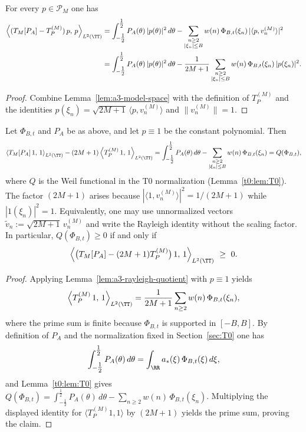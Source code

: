 \begin{lemma}\label{lem:a3-rayleigh-quotient}
For every $p\in\mathcal P_M$ one has
\begin{align*}
  \left\langle (T_M[P_A]-T_P^{(M)})\,p,\,p\right\rangle_{L^2(\TT)}
  &= \int_{-\tfrac12}^{\tfrac12} P_A(\theta)\,|p(\theta)|^2\,d\theta
    - \sum_{\substack{n\ge2\\ |\xi_n|\le B}} w(n)\,\Phi_{B,t}(\xi_n)\,|\langle p,v_n^{(M)}\rangle|^2 \\
  &= \int_{-\tfrac12}^{\tfrac12} P_A(\theta)\,|p(\theta)|^2\,d\theta
    - \frac{1}{2M+1}\sum_{\substack{n\ge2\\ |\xi_n|\le B}} w(n)\,\Phi_{B,t}(\xi_n)\,|p(\xi_n)|^2.
\end{align*}
\end{lemma}

\begin{proof}
Combine Lemma~\ref{lem:a3-model-space} with the definition of $T_P^{(M)}$ and the identities
$p(\xi_n)=\sqrt{2M+1}\,\langle p,v_n^{(M)}\rangle$ and $\|v_n^{(M)}\|=1$.
\end{proof}

\begin{theorem}\label{thm:a3-rayleigh-identification}
Let $\Phi_{B,t}$ and $P_A$ be as above, and let $p\equiv1$ be the constant polynomial.
Then
\[
  \left\langle T_M[P_A]\,1,\,1\right\rangle_{L^2(\TT)}
  - (2M+1)\left\langle T_P^{(M)}\,1,\,1\right\rangle_{L^2(\TT)}
  = \int_{-\tfrac12}^{\tfrac12} P_A(\theta)\,d\theta
    - \sum_{\substack{n\ge2\\ |\xi_n|\le B}} w(n)\,\Phi_{B,t}(\xi_n)
  = Q(\Phi_{B,t}),
\]
where $Q$ is the Weil functional in the T0 normalization (Lemma~\ref{t0:lem:T0}).  The factor
$(2M{+}1)$ arises because $|\langle 1,v_n^{(M)}\rangle|^2 = 1/(2M{+}1)$ while
$|1(\xi_n)|^2 = 1$.  Equivalently, one may use unnormalized vectors
$\tilde v_n := \sqrt{2M{+}1}\,v_n^{(M)}$ and write the Rayleigh identity without the scaling
factor.  In particular, $Q(\Phi_{B,t})\ge0$ if and only if
\[
  \left\langle \bigl(T_M[P_A]-(2M+1)T_P^{(M)}\bigr)\,1,\,1\right\rangle_{L^2(\TT)}\ \ge\ 0.
\]
\end{theorem}

\begin{proof}
Applying Lemma~\ref{lem:a3-rayleigh-quotient} with $p\equiv1$ yields
\[
  \left\langle T_P^{(M)}\,1,\,1\right\rangle_{L^2(\TT)}
  = \frac{1}{2M+1}\sum_{n\ge2} w(n)\,\Phi_{B,t}(\xi_n),
\]
where the prime sum is finite because $\Phi_{B,t}$ is supported in $[-B,B]$.
By definition of $P_A$ and the normalization fixed in Section~\ref{sec:T0} one has
\[
  \int_{-\tfrac12}^{\tfrac12} P_A(\theta)\,d\theta
  = \int_{\RR} a_*(\xi)\,\Phi_{B,t}(\xi)\,d\xi,
\]
and Lemma~\ref{t0:lem:T0} gives
$Q(\Phi_{B,t}) = \int_{-\tfrac12}^{\tfrac12}P_A(\theta)\,d\theta
       - \sum_{n\ge2}w(n)\,\Phi_{B,t}(\xi_n)$.
Multiplying the displayed identity for $\langle T_P^{(M)}1,1\rangle$ by $(2M+1)$ yields
the prime sum, proving the claim.
\end{proof}
